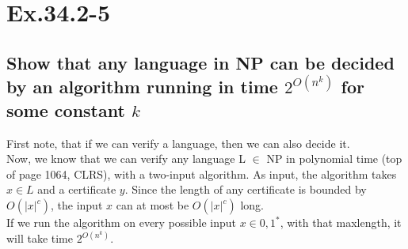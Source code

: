 \section*{Ex.34.2-5}
\subsection*{Show that any language in NP can be decided by an algorithm running in time $2^{O(n^k)}$ for some constant $k$}

First note, that if we can verify a language, then we can also decide it.
\\
Now, we know that we can verify any language L $\in$ NP in polynomial time (top of page 1064, CLRS), with a two-input algorithm. As input, the algorithm takes $x\in L$ and a certificate $y$. Since the length of any certificate is bounded by $O(|x|^c)$, the input $x$ can at most be $O(|x|^c)$ long.
\\
If we run the algorithm on every possible input $x\in {0,1}^*$, with that maxlength, it will take time $2^{O(n^k)}$.